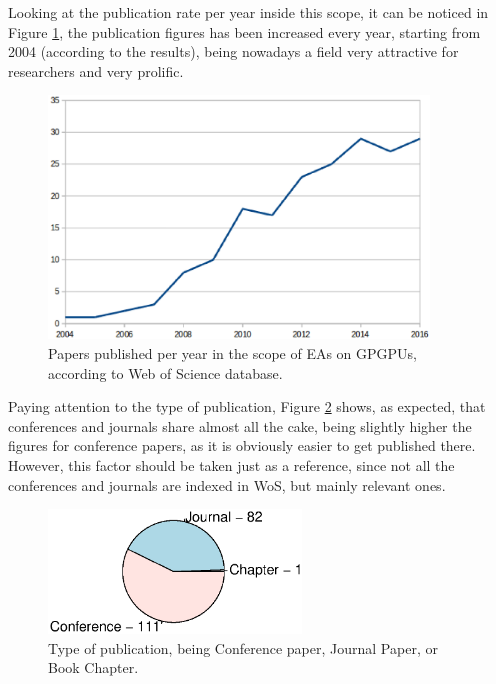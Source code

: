 \documentclass{article}
\begin{document}
Looking at the publication rate per year inside this scope, it can be noticed in Figure \ref{figure:publications}, the publication figures has been increased  every year, starting from 2004 (according to the results), being nowadays a field very attractive for researchers and very prolific.

\begin{figure}[!ht]
\centering
\includegraphics[width=0.9\textwidth]{years.eps}
\caption{Papers published per year in the scope of EAs on GPGPUs, according to Web of Science database.}
\label{figure:publications}
\end{figure}


Paying attention to the type of publication, Figure \ref{figure:type_publication} shows, as expected, that conferences and journals share almost all the cake, being slightly higher the figures for conference papers, as it is obviously easier to get published there. However, this factor should be taken just as a reference, since not all the conferences and journals are indexed in WoS, but mainly relevant ones.

\begin{figure}[!ht]
\centering
\includegraphics[width=0.6\textwidth]{papertype.eps}
\caption{Type of publication, being Conference paper, Journal Paper, or Book Chapter.}
\label{figure:type_publication}
\end{figure}
\end{document}
